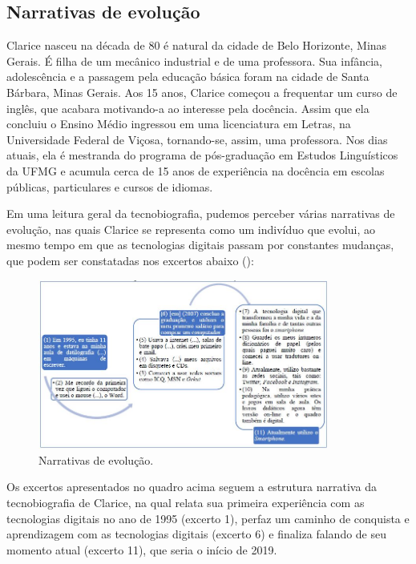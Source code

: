 \documentclass{textolivre-html}
\begin{document}
\subsection{Narrativas de evolução}\label{sec-evolucao}
Clarice nasceu na década de 80 é natural da cidade de Belo Horizonte, Minas Gerais. É filha de um mecânico industrial e de uma professora. Sua infância, adolescência e a passagem pela educação básica foram na cidade de Santa Bárbara, Minas Gerais. Aos 15 anos, Clarice começou a frequentar um curso de inglês, que acabara motivando-a ao interesse pela docência. Assim que ela concluiu o Ensino Médio ingressou em uma licenciatura em Letras, na Universidade Federal de Viçosa, tornando-se, assim, uma professora. Nos dias atuais, ela é mestranda do programa de pós-graduação em Estudos Linguísticos da UFMG e acumula cerca de 15 anos de experiência na docência em escolas públicas, particulares e cursos de idiomas.

Em uma leitura geral da tecnobiografia, pudemos perceber várias narrativas de evolução, nas quais Clarice se representa como um indivíduo que evolui, ao mesmo tempo em que as tecnologias digitais passam por constantes mudanças, que podem ser constatadas nos excertos abaixo (): 

\begin{figure}[htbp]
 \centering
 \includegraphics[width=0.85\textwidth]{fig01.png}
 \caption{Narrativas de evolução.}
 \label{fig01}
\end{figure}

Os excertos apresentados no quadro acima seguem a estrutura narrativa da tecnobiografia de Clarice, na qual relata sua primeira experiência com as tecnologias digitais no ano de 1995 (excerto 1), perfaz um caminho de conquista e aprendizagem com as tecnologias digitais (excerto 6) e finaliza falando de seu momento atual (excerto 11), que seria o início de 2019.
\end{document}
